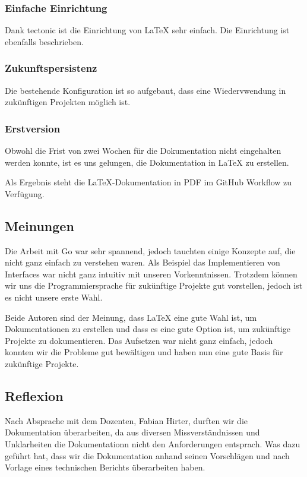 \subsubsection{Einfache Einrichtung}
Dank tectonic ist die Einrichtung von LaTeX sehr einfach. Die Einrichtung ist ebenfalls beschrieben.

\subsubsection{Zukunftspersistenz}
Die bestehende Konfiguration ist so aufgebaut, dass eine Wiedervwendung in zukünftigen Projekten möglich ist.


\subsubsection{Erstversion}
Obwohl die Frist von zwei Wochen für die Dokumentation nicht eingehalten werden konnte,
ist es uns gelungen, die Dokumentation in LaTeX zu erstellen.

Als Ergebnis steht die LaTeX-Dokumentation in PDF im GitHub Workflow zu Verfügung.

\newpage
\subsection{Meinungen}

Die Arbeit mit Go war sehr spannend, jedoch tauchten einige Konzepte auf, die nicht ganz einfach zu verstehen waren. Als Beispiel das Implementieren von Interfaces war nicht ganz intuitiv mit unseren Vorkenntnissen. Trotzdem können wir uns die Programmiersprache für zukünftige Projekte gut vorstellen, jedoch ist es nicht unsere erste Wahl. 
\linebreak

Beide Autoren sind der Meinung, dass LaTeX eine gute Wahl ist, um Dokumentationen zu erstellen und dass es eine gute Option ist, um zukünftige Projekte zu dokumentieren. Das Aufsetzen war nicht ganz einfach, jedoch konnten wir die Probleme gut bewältigen und haben nun eine gute Basis für zukünftige Projekte.


\subsection{Reflexion}
Nach Absprache mit dem Dozenten, Fabian Hirter, durften wir die Dokumentation überarbeiten, da aus diversen Missverständnissen und Unklarheiten die Dokumentationn nicht den Anforderungen entsprach. Was dazu geführt hat, dass wir die Dokumentation anhand seinen Vorschlägen und nach Vorlage eines technischen Berichts überarbeiten haben.
\newline

